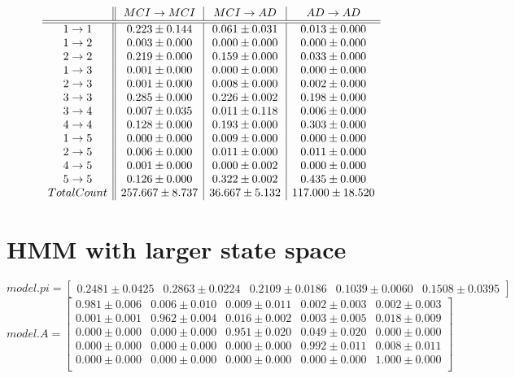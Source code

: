 \documentclass[12pt,a4paper]{article}
\begin{document}
\[ \begin{array}{ c || c | c | c }
& MCI \rightarrow MCI & MCI \rightarrow AD & AD \rightarrow AD \\
\hline
\hline
1 \rightarrow 1 & 0.223 \pm 0.144 & 0.061 \pm 0.031 & 0.013 \pm 0.000 \\
1 \rightarrow 2 & 0.003 \pm 0.000 & 0.000 \pm 0.000 & 0.000 \pm 0.000 \\
2 \rightarrow 2 & 0.219 \pm 0.000 & 0.159 \pm 0.000 & 0.033 \pm 0.000 \\
1 \rightarrow 3 & 0.001 \pm 0.000 & 0.000 \pm 0.000 & 0.000 \pm 0.000 \\
2 \rightarrow 3 & 0.001 \pm 0.000 & 0.008 \pm 0.000 & 0.002 \pm 0.000 \\
3 \rightarrow 3 & 0.285 \pm 0.000 & 0.226 \pm 0.002 & 0.198 \pm 0.000 \\
3 \rightarrow 4 & 0.007 \pm 0.035 & 0.011 \pm 0.118 & 0.006 \pm 0.000 \\
4 \rightarrow 4 & 0.128 \pm 0.000 & 0.193 \pm 0.000 & 0.303 \pm 0.000 \\
1 \rightarrow 5 & 0.000 \pm 0.000 & 0.009 \pm 0.000 & 0.000 \pm 0.000 \\
2 \rightarrow 5 & 0.006 \pm 0.000 & 0.011 \pm 0.000 & 0.011 \pm 0.000 \\
4 \rightarrow 5 & 0.001 \pm 0.000 & 0.000 \pm 0.002 & 0.000 \pm 0.000 \\
5 \rightarrow 5 & 0.126 \pm 0.000 & 0.322 \pm 0.002 & 0.435 \pm 0.000 \\
Total Count & 257.667 \pm 8.737 & 36.667 \pm 5.132 & 117.000 \pm 18.520 \\
\end{array} \]

\section{HMM with larger state space}

\[
model.pi = \left[ 
\begin{array}{ccccc} 
0.2481 \pm 0.0425 & 0.2863 \pm 0.0224 & 0.2109 \pm 0.0186 & 0.1039 \pm
0.0060 & 0.1508 \pm 0.0395
\end{array}
 \right]
\]
\[
model.A = \left[ 
\begin{array}{ccccc} 
0.981 \pm 0.006 & 0.006 \pm 0.010 & 0.009 \pm 0.011 & 0.002 \pm 0.003
& 0.002 \pm 0.003 \\
 0.001 \pm 0.001 & 0.962 \pm 0.004 & 0.016 \pm 0.002 & 0.003 \pm 0.005
 & 0.018 \pm 0.009 \\
 0.000 \pm 0.000 & 0.000 \pm 0.000 & 0.951 \pm 0.020 & 0.049 \pm 0.020
 & 0.000 \pm 0.000 \\
 0.000 \pm 0.000 & 0.000 \pm 0.000 & 0.000 \pm 0.000 & 0.992 \pm 0.011
 & 0.008 \pm 0.011 \\
 0.000 \pm 0.000 & 0.000 \pm 0.000 & 0.000 \pm 0.000 & 0.000 \pm 0.000
 & 1.000 \pm 0.000 \\
\end{array}
 \right]
\]
\end{document}
